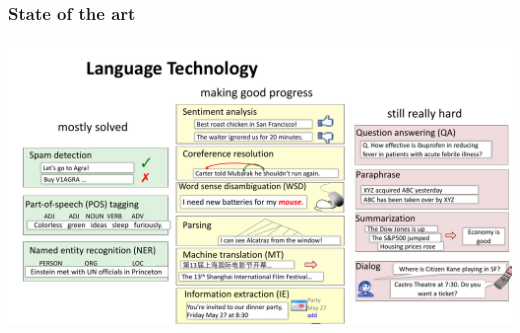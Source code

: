 \documentclass[dvipsnames]{beamer}
\begin{document}

\begin{frame}
\frametitle{State of the art}
\noindent
\hspace{-1.17cm}
\includegraphics[scale=0.5]{progress}
\end{frame}
\end{document}
